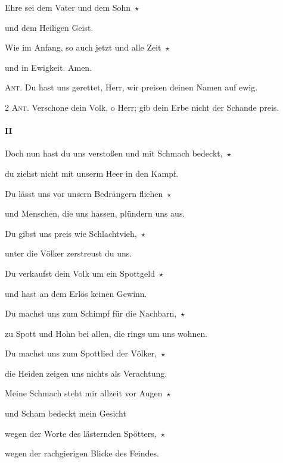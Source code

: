 \noindent Ehre sei dem Vater und dem Sohn~$\star$~\nopagebreak

und dem Heiligen Geist.

\noindent Wie im Anfang, so auch jetzt und alle Zeit~$\star$~\nopagebreak

und in Ewigkeit. Amen.

\vspace{10pt}

\noindent \textsc{Ant.} Du hast uns gerettet, Herr, wir preisen deinen Namen auf ewig. 


\newpage

\noindent \textsc{2 Ant.} Verschone dein Volk, o Herr; gib dein Erbe nicht der Schande preis.

\paragraph{II}

\noindent Doch nun hast du uns verstoßen und mit Schmach bedeckt,~$\star$~\nopagebreak

du ziehst nicht mit unserm Heer in den Kampf. 

 \noindent Du lässt uns vor unsern Bedrängern fliehen~$\star$~\nopagebreak

und Menschen, die uns hassen, plündern uns aus. 

 \noindent Du gibst uns preis wie Schlachtvieh,~$\star$~\nopagebreak

unter die Völker zerstreust du uns. 

 \noindent Du verkaufst dein Volk um ein Spottgeld~$\star$~\nopagebreak

und hast an dem Erlös keinen Gewinn. 

 \noindent Du machst uns zum Schimpf für die Nachbarn,~$\star$~\nopagebreak

zu Spott und Hohn bei allen, die rings um uns wohnen.

\noindent Du machst uns zum Spottlied der Völker,~$\star$~\nopagebreak

die Heiden zeigen uns nichts als Verachtung.

\noindent Meine Schmach steht mir allzeit vor Augen~$\star$~\nopagebreak

und Scham bedeckt mein Gesicht

\noindent wegen der Worte des lästernden Spötters,~$\star$~\nopagebreak

wegen der rachgierigen Blicke des Feindes.

